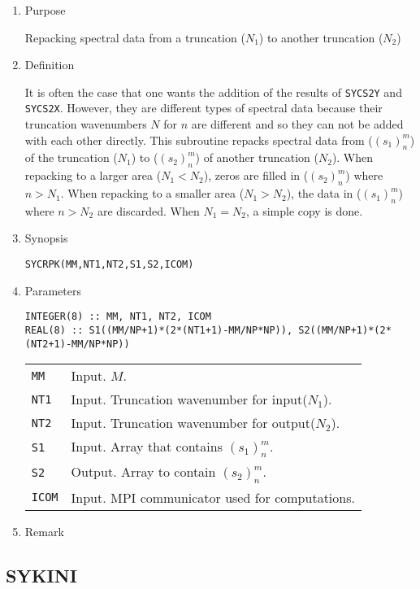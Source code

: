 \documentclass[a4paper]{scrartcl}
\begin{document}
\begin{enumerate}

\item Purpose

Repacking spectral data from 
a truncation ($N_1$) to another truncation ($N_2$)

\item Definition

It is often the case that one wants the addition of the results
of \texttt{SYCS2Y} and \texttt{SYCS2X}. However, they are different
types of spectral data because their truncation wavenumbers $N$ for
$n$ are different and so they can not be added with each other
directly. This subroutine 
repacks spectral data from ($(s_1)^m_n$) of
the truncation ($N_1$) to ($(s_2)^m_n$)
of another truncation ($N_2$).
When repacking to a larger area ($N_1<N_2$),
zeros are filled in ($(s_2)^m_n$) where $n>N_1$.
When repacking to a smaller area ($N_1> N_2$),
the data in ($(s_1)^m_n$) where $n>N_2$ are discarded.
When $N_1=N_2$, a simple copy is done.

\item Synopsis 
    
\texttt{SYCRPK(MM,NT1,NT2,S1,S2,ICOM)}
  
\item Parameters

\begin{verbatim}
INTEGER(8) :: MM, NT1, NT2, ICOM
REAL(8) :: S1((MM/NP+1)*(2*(NT1+1)-MM/NP*NP)), S2((MM/NP+1)*(2*(NT2+1)-MM/NP*NP))
\end{verbatim}

\begin{tabular}{ll}
\texttt{MM} & Input. $M$.\\  
\texttt{NT1} & Input. Truncation wavenumber for input($N_1$).\\
\texttt{NT2} & Input. Truncation wavenumber for output($N_2$).\\
\texttt{S1} & Input. Array that contains $(s_1)^m_n$.\\
\texttt{S2} & Output. Array to contain $(s_2)^m_n$.\\
\texttt{ICOM} & Input. MPI communicator used for computations.
\end{tabular}

\item Remark

\end{enumerate}  

\subsection{SYKINI}
\end{document}
